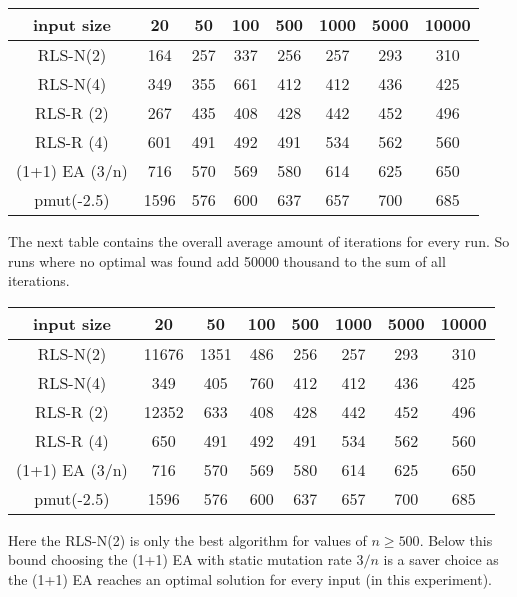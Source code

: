 \begin{tabular}{cccccccc}
      input size     & 20   & 50  & 100 & 500 & 1000 & 5000 & 10000 \\\hline
      RLS-N(2)       & 164  & 257 & 337 & 256 & 257  & 293  & 310   \\
      RLS-N(4)       & 349  & 355 & 661 & 412 & 412  & 436  & 425   \\
      RLS-R (2)      & 267  & 435 & 408 & 428 & 442  & 452  & 496   \\
      RLS-R (4)      & 601  & 491 & 492 & 491 & 534  & 562  & 560   \\
      (1+1) EA (3/n) & 716  & 570 & 569 & 580 & 614  & 625  & 650   \\
      pmut(-2.5)     & 1596 & 576 & 600 & 637 & 657  & 700  & 685   \\
\end{tabular}

The next table contains the overall average amount of iterations for every run.
So runs where no optimal was found add 50000 thousand to the sum of all iterations.

\begin{tabular}{cccccccc}
      input size     & 20    & 50   & 100 & 500 & 1000 & 5000 & 10000 \\\hline
      RLS-N(2)       & 11676 & 1351 & 486 & 256 & 257  & 293  & 310   \\
      RLS-N(4)       & 349   & 405  & 760 & 412 & 412  & 436  & 425   \\
      RLS-R (2)      & 12352 & 633  & 408 & 428 & 442  & 452  & 496   \\
      RLS-R (4)      & 650   & 491  & 492 & 491 & 534  & 562  & 560   \\
      (1+1) EA (3/n) & 716   & 570  & 569 & 580 & 614  & 625  & 650   \\
      pmut(-2.5)     & 1596  & 576  & 600 & 637 & 657  & 700  & 685   \\
\end{tabular}

Here the RLS-N(2) is only the best algorithm for values of $n \ge 500$.
Below this bound choosing the (1+1) EA with static mutation rate $3/n$ is a saver choice as the (1+1) EA reaches an optimal solution for every input (in this experiment).